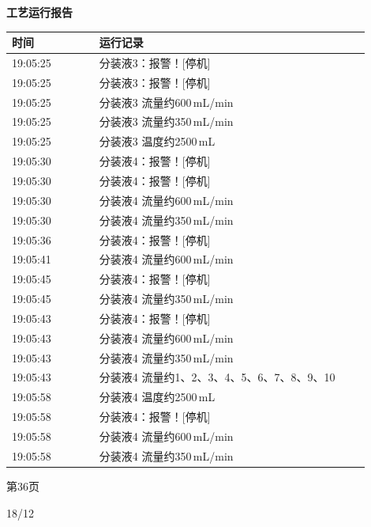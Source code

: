 \documentclass[UTF8,10pt,a4paper,fontset=fandol]{ctexart}
\newcommand{\handwritten}[1]{#1}
\begin{document}
\begin{minipage}[t]{0.47\linewidth}
\centering
\textbf{工艺运行报告}

\vspace{2mm}
\scriptsize
\begin{tabular}{|p{0.22\linewidth}|p{0.68\linewidth}|}
\hline
时间 & 运行记录 \\ \hline
19:05:25 & 分装液3：报警！[停机] \\ \hline
19:05:25 & 分装液3：报警！[停机] \\ \hline
19:05:25 & 分装液3 流量约600\,mL/min \\ \hline
19:05:25 & 分装液3 流量约350\,mL/min \\ \hline
19:05:25 & 分装液3 温度约2500\,mL \\ \hline
19:05:30 & 分装液4：报警！[停机] \\ \hline
19:05:30 & 分装液4：报警！[停机] \\ \hline
19:05:30 & 分装液4 流量约600\,mL/min \\ \hline
19:05:30 & 分装液4 流量约350\,mL/min \\ \hline
19:05:36 & 分装液4：报警！[停机] \\ \hline
19:05:41 & 分装液4 流量约600\,mL/min \\ \hline
19:05:45 & 分装液4：报警！[停机] \\ \hline
19:05:45 & 分装液4 流量约350\,mL/min \\ \hline
19:05:43 & 分装液4：报警！[停机] \\ \hline
19:05:43 & 分装液4 流量约600\,mL/min \\ \hline
19:05:43 & 分装液4 流量约350\,mL/min \\ \hline
19:05:43 & 分装液4 流量约1、2、3、4、5、6、7、8、9、10 \\ \hline
19:05:58 & 分装液4 温度约2500\,mL \\ \hline
19:05:58 & 分装液4：报警！[停机] \\ \hline
19:05:58 & 分装液4 流量约600\,mL/min \\ \hline
19:05:58 & 分装液4 流量约350\,mL/min \\ \hline
\end{tabular}

\vspace{2mm}
第36页
\end{minipage}

\vfill

\handwritten{18/12}
\end{document}
